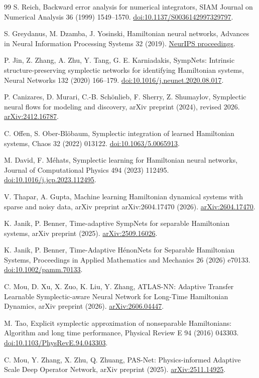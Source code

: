 \documentclass[final,3p,times]{elsarticle}
\begin{document}
\begin{thebibliography}{99}
S. Reich, Backward error analysis for numerical integrators,
SIAM Journal on Numerical Analysis 36 (1999) 1549--1570.
\href{https://doi.org/10.1137/S0036142997329797}{doi:10.1137/S0036142997329797}.

S. Greydanus, M. Dzamba, J. Yosinski,
Hamiltonian neural networks,
Advances in Neural Information Processing Systems 32 (2019).
\href{https://proceedings.neurips.cc/paper/2019/hash/26cd8ecadce0d4efd6cc8a8725cbd1f8-Abstract.html}{NeurIPS proceedings}.

P. Jin, Z. Zhang, A. Zhu, Y. Tang, G. E. Karniadakis,
SympNets: Intrinsic structure-preserving symplectic networks for identifying
Hamiltonian systems,
Neural Networks 132 (2020) 166--179.
\href{https://doi.org/10.1016/j.neunet.2020.08.017}{doi:10.1016/j.neunet.2020.08.017}.

P. Canizares, D. Murari, C.-B. Sch\"onlieb, F. Sherry, Z. Shumaylov,
Symplectic neural flows for modeling and discovery,
arXiv preprint (2024), revised 2026.
\href{https://arxiv.org/abs/2412.16787}{arXiv:2412.16787}.

C. Offen, S. Ober-Bl\"obaum,
Symplectic integration of learned Hamiltonian systems,
Chaos 32 (2022) 013122.
\href{https://doi.org/10.1063/5.0065913}{doi:10.1063/5.0065913}.

M. David, F. M\'ehats,
Symplectic learning for Hamiltonian neural networks,
Journal of Computational Physics 494 (2023) 112495.
\href{https://doi.org/10.1016/j.jcp.2023.112495}{doi:10.1016/j.jcp.2023.112495}.

V. Thapar, A. Gupta,
Machine learning Hamiltonian dynamical systems with sparse and noisy data,
arXiv preprint arXiv:2604.17470 (2026).
\href{https://arxiv.org/abs/2604.17470}{arXiv:2604.17470}.

K. Janik, P. Benner,
Time-adaptive SympNets for separable Hamiltonian systems,
arXiv preprint (2025).
\href{https://arxiv.org/abs/2509.16026}{arXiv:2509.16026}.

K. Janik, P. Benner,
Time-Adaptive H\'enonNets for Separable Hamiltonian Systems,
Proceedings in Applied Mathematics and Mechanics 26 (2026) e70133.
\href{https://doi.org/10.1002/pamm.70133}{doi:10.1002/pamm.70133}.

C. Mou, D. Xu, X. Zuo, K. Liu, Y. Zhang,
ATLAS-NN: Adaptive Transfer Learnable Symplectic-aware Neural Network
for Long-Time Hamiltonian Dynamics,
arXiv preprint (2026).
\href{https://arxiv.org/abs/2606.04447}{arXiv:2606.04447}.

M. Tao, Explicit symplectic approximation of nonseparable Hamiltonians:
Algorithm and long time performance,
Physical Review E 94 (2016) 043303.
\href{https://doi.org/10.1103/PhysRevE.94.043303}{doi:10.1103/PhysRevE.94.043303}.

C. Mou, Y. Zhang, X. Zhu, Q. Zhuang,
PAS-Net: Physics-informed Adaptive Scale Deep Operator Network,
arXiv preprint (2025).
\href{https://arxiv.org/abs/2511.14925}{arXiv:2511.14925}.
\end{thebibliography}
\end{document}
